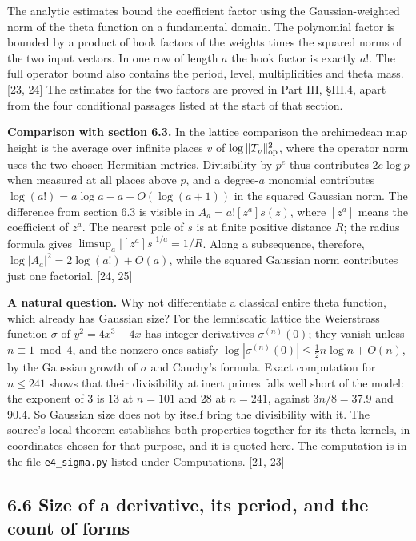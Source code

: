 \documentclass[11pt,letterpaper]{article}
\begin{document}
{The analytic estimates bound the coefficient factor using the Gaussian-weighted norm of the theta function on a fundamental domain. The polynomial factor is bounded by a product of hook factors of the weights times the squared norms of the two input vectors. In one row of length $a$ the hook factor is exactly $a!$. The full operator bound also contains the period, level, multiplicities and theta mass. [23, 24] The estimates for the two factors are proved in Part III, \S III.4, apart from the four conditional passages listed at the start of that section.

\textbf{Comparison with section 6.3.} In the lattice comparison the archimedean map height is the average over infinite places $v$ of $\log\|T_v\|_{\rm op}^2$, where the operator norm uses the two chosen Hermitian metrics. Divisibility by $p^e$ thus contributes $2e\log p$ when measured at all places above $p$, and a degree-$a$ monomial contributes $\log(a!)=a\log a-a+O(\log(a+1))$ in the squared Gaussian norm. The difference from section 6.3 is visible in $A_a=a![z^a]s(z)$, where $[z^a]$ means the coefficient of $z^a$. The nearest pole of $s$ is at finite positive distance $R$; the radius formula gives $\limsup_a|[z^a]s|^{1/a}=1/R$. Along a subsequence, therefore, $\log|A_a|^2=2\log(a!)+O(a)$, while the squared Gaussian norm contributes just one factorial. [24, 25]

\newpage
\textbf{A natural question.} Why not differentiate a classical entire theta function, which already has Gaussian size? For the lemniscatic lattice the Weierstrass function $\sigma$ of $y^2=4x^3-4x$ has integer derivatives $\sigma^{(n)}(0)$; they vanish unless $n\equiv1\bmod4$, and the nonzero ones satisfy $\log|\sigma^{(n)}(0)|\le\tfrac12n\log n+O(n)$, by the Gaussian growth of $\sigma$ and Cauchy's formula. Exact computation for $n\le241$ shows that their divisibility at inert primes falls well short of the model: the exponent of $3$ is $13$ at $n=101$ and $28$ at $n=241$, against $3n/8=37.9$ and $90.4$. So Gaussian size does not by itself bring the divisibility with it. The source's local theorem establishes both properties together for its theta kernels, in coordinates chosen for that purpose, and it is quoted here. The computation is in the file \texttt{e4\_sigma.py} listed under Computations. [21, 23]

\subsection*{6.6 Size of a derivative, its period, and the count of forms}

}
\end{document}
